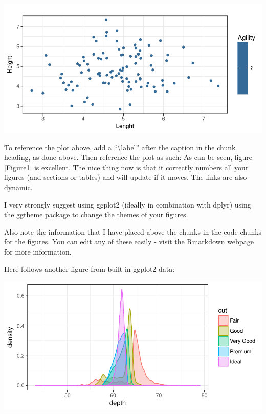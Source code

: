 \documentclass[11pt,preprint, authoryear]{elsarticle}
\let\origfigure\figure
\let\endorigfigure\endfigure
\renewenvironment{figure}[1][2] {
    \expandafter\origfigure\expandafter[H]
} {
    \endorigfigure
}
\numberwithin{equation}{section}
\numberwithin{figure}{section}
\numberwithin{table}{section}
\begin{document}
\begin{figure}[H]

{\centering \includegraphics{Template_files/figure-latex/Figure1-1} 

}

\caption{Caption Here \label{Figure1}}\label{fig:Figure1}
\end{figure}

To reference the plot above, add a ``\textbackslash{}label'' after the
caption in the chunk heading, as done above. Then reference the plot as
such: As can be seen, figure \ref{Figure1} is excellent. The nice thing
now is that it correctly numbers all your figures (and sections or
tables) and will update if it moves. The links are also dynamic.

I very strongly suggest using ggplot2 (ideally in combination with
dplyr) using the ggtheme package to change the themes of your figures.

Also note the information that I have placed above the chunks in the
code chunks for the figures. You can edit any of these easily - visit
the Rmarkdown webpage for more information.

Here follows another figure from built-in ggplot2 data:

\begin{figure}[H]

{\centering \includegraphics{Template_files/figure-latex/figure2-1} 

}

\caption{Diamond Cut Plot \label{lit}}\label{fig:figure2}
\end{figure}
\end{document}
